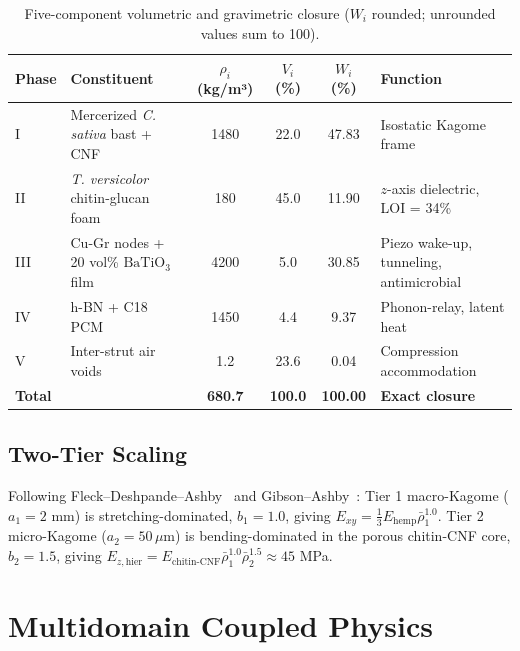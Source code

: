 \documentclass[11pt,a4paper]{article}
\theoremstyle{definition}
\theoremstyle{remark}
\begin{document}
\begin{table}[h!]\centering\small
\begin{tabular}{@{}llcccp{4.5cm}@{}}
\toprule
\textbf{Phase} & \textbf{Constituent} & $\rho_i$ (kg/m³) & $V_i$ (\%) & $W_i$ (\%) & \textbf{Function} \\
\midrule
I   & Mercerized \textit{C. sativa} bast + CNF & 1480 & 22.0 & 47.83 & Isostatic Kagome frame~\cite{maxwell1864,guest2003} \\
II  & \textit{T. versicolor} chitin-glucan foam & 180 & 45.0 & 11.90 & $z$-axis dielectric, LOI = 34\% \\
III & Cu-Gr nodes + 20 vol\% $\text{BaTiO}_3$ film & 4200 & 5.0 & 30.85 & Piezo wake-up, tunneling, antimicrobial \\
IV  & h-BN + C18 PCM & 1450 & 4.4 & 9.37 & Phonon-relay, latent heat \\
V   & Inter-strut air voids & 1.2 & 23.6 & 0.04 & Compression accommodation \\
\midrule
\textbf{Total} & & \textbf{680.7} & \textbf{100.0} & \textbf{100.00} & \textbf{Exact closure} \\
\bottomrule
\end{tabular}
\caption{Five-component volumetric and gravimetric closure ($W_i$ rounded; unrounded values sum to 100).}
\end{table}

\subsection{Two-Tier Scaling}
Following Fleck--Deshpande--Ashby~\cite{fleck2010} and Gibson--Ashby~\cite{gibson1997}: Tier 1 macro-Kagome ($a_1 = 2$ mm) is stretching-dominated, $b_1 = 1.0$, giving $E_{xy} = \tfrac{1}{3}E_{\text{hemp}}\bar\rho_1^{1.0}$. Tier 2 micro-Kagome ($a_2 = 50\,\mu$m) is bending-dominated in the porous chitin-CNF core, $b_2 = 1.5$, giving $E_{z,\text{hier}} = E_{\text{chitin-CNF}}\bar\rho_1^{1.0}\bar\rho_2^{1.5} \approx 45$ MPa.

\section{Multidomain Coupled Physics}
\end{document}
